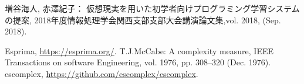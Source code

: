 \begin{thebibliography}{99}
	増谷海人, 赤澤紀子： 仮想現実を用いた初学者向けプログラミング学習システムの提案, 2018年度情報処理学会関西支部支部大会講演論文集,vol. 2018, (Sep. 2018).

	Esprima, \url{https://esprima.org/}.
	 T.J.McCabe: A complexity measure, IEEE Transactions on software Engineering, vol. 1976, pp. 308--320 (Dec. 1976).
	escomplex, \url{https://github.com/escomplex/escomplex}.

\end{thebibliography}